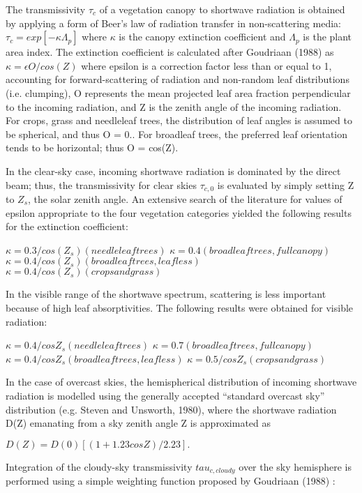 The transmissivity $\tau_c$ of a vegetation canopy to shortwave radiation is obtained by applying a form of Beer’s law of radiation transfer in non-\/scattering media\+: $\tau_c = exp[-\kappa \Lambda_p]$ where $\kappa$ is the canopy extinction coefficient and $\Lambda_p$ is the plant area index. The extinction coefficient is calculated after Goudriaan (1988) \cite{Gold1958-ng} as $\kappa = \epsilon O/cos(Z)$ where epsilon is a correction factor less than or equal to 1, accounting for forward-\/scattering of radiation and non-\/random leaf distributions (i.\+e. clumping), O represents the mean projected leaf area fraction perpendicular to the incoming radiation, and Z is the zenith angle of the incoming radiation. For crops, grass and needleleaf trees, the distribution of leaf angles is assumed to be spherical, and thus O = 0.. For broadleaf trees, the preferred leaf orientation tends to be horizontal; thus O = cos(\+Z).

In the clear-\/sky case, incoming shortwave radiation is dominated by the direct beam; thus, the transmissivity for clear skies $\tau_{c,0}$ is evaluated by simply setting Z to $Z_s$, the solar zenith angle. An extensive search of the literature for values of epsilon appropriate to the four vegetation categories yielded the following results for the extinction coefficient\+:

$\kappa = 0.3/cos(Z_s) (needleleaf trees)$ $\kappa = 0.4 (broadleaf trees, full canopy)$ $\kappa = 0.4/cos(Z_s) (broadleaf trees, leafless)$ $\kappa = 0.4/cos(Z_s) (crops and grass)$

In the visible range of the shortwave spectrum, scattering is less important because of high leaf absorptivities. The following results were obtained for visible radiation\+:

$\kappa = 0.4/cosZ_s (needleleaf trees)$ $\kappa = 0.7 (broadleaf trees, full canopy)$ $\kappa = 0.4/cosZ_s (broadleaf trees, leafless)$ $\kappa = 0.5/cosZ_s (crops and grass)$

In the case of overcast skies, the hemispherical distribution of incoming shortwave radiation is modelled using the generally accepted “standard overcast sky” distribution (e.\+g. Steven and Unsworth, 1980), where the shortwave radiation D(\+Z) emanating from a sky zenith angle Z is approximated as

$D(Z) = D(0) [(1 + 1.23cosZ)/2.23].$

Integration of the cloudy-\/sky transmissivity $tau_{c,cloudy}$ over the sky hemisphere is performed using a simple weighting function proposed by Goudriaan (1988) \cite{Gold1958-ng} \+:

